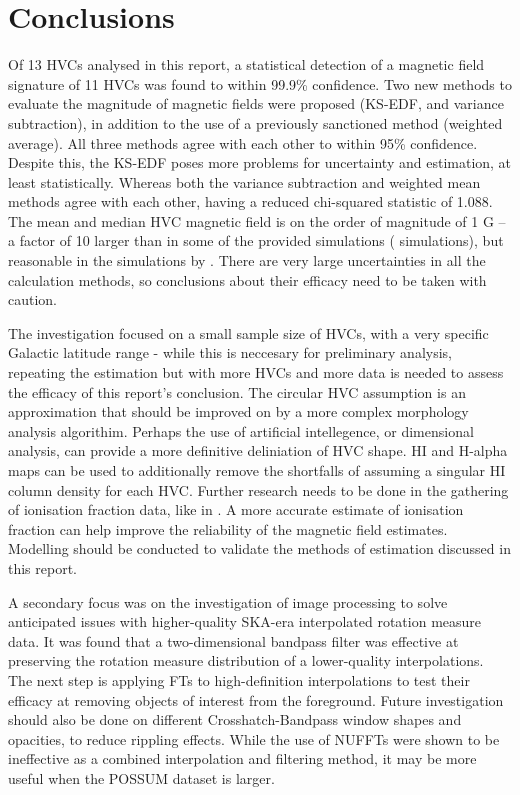 \chapter{Conclusions}
\label{cha:conclusion}

Of 13 HVCs analysed in this report, a statistical detection of a magnetic field signature of 11 HVCs was found to within 99.9\% confidence. Two new methods to evaluate the magnitude of magnetic fields were proposed (KS-EDF, and variance subtraction), in addition to the use of a previously sanctioned method (weighted average). All three methods agree with each other to within 95\% confidence. Despite this, the KS-EDF poses more problems for uncertainty and estimation, at least statistically. Whereas both the variance subtraction and weighted mean methods agree with each other, having a reduced chi-squared statistic of 1.088. The mean and median HVC magnetic field is on the order of magnitude of 1 \textmu G – a factor of 10 larger than in some of the provided simulations (\citeauthor{ID23} simulations), but reasonable in the simulations by \cite{ID34}. There are very large uncertainties in all the calculation methods, so conclusions about their efficacy need to be taken with caution.


The investigation focused on a small sample size of HVCs, with a very specific Galactic latitude range - while this is neccesary for preliminary analysis, repeating the estimation but with more HVCs and more data is needed to assess the efficacy of this report's conclusion. The circular HVC assumption is an approximation that should be improved on by a more complex morphology analysis algorithim. Perhaps the use of artificial intellegence, or dimensional analysis, can provide a more definitive deliniation of HVC shape. HI and H-alpha maps can be used to additionally remove the shortfalls of assuming a singular HI column density for each HVC. Further research needs to be done in the gathering of ionisation fraction data, like in \cite{ID67}. A more accurate estimate of ionisation fraction can help improve the reliability of the magnetic field estimates. Modelling should be conducted to validate the methods of estimation discussed in this report.


A secondary focus was on the investigation of image processing to solve anticipated issues with higher-quality SKA-era interpolated rotation measure data. It was found that a two-dimensional bandpass filter was effective at preserving the rotation measure distribution of a lower-quality interpolations. The next step is applying FTs to high-definition interpolations to test their efficacy at removing objects of interest from the foreground. Future investigation should also be done on different Crosshatch-Bandpass window shapes and opacities, to reduce rippling effects. While the use of NUFFTs were shown to be ineffective as a combined interpolation and filtering method, it may be more useful when the POSSUM dataset is larger.
